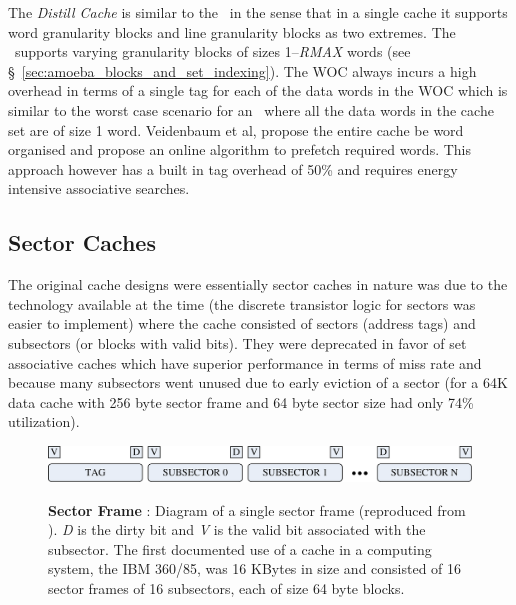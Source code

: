 The \textit{Distill Cache} is similar to the \AC\ in the sense that in a single cache it supports word granularity blocks and line granularity blocks as two extremes. The \AC\ supports varying granularity blocks of sizes 1--\textit{RMAX} words (see \S~\ref{sec:amoeba_blocks_and_set_indexing}). The WOC always incurs a high overhead in terms of a single tag for each of the data words in the WOC which is similar to the worst case scenario for an \AC\ where all the data words in the cache set are of size 1 word. Veidenbaum et al\cite{Veidenbaum:1999:ACL:305138.305188}, propose the entire cache be word organised and propose an online algorithm to prefetch required words. This approach however has a built in tag overhead of 50\% and requires energy intensive associative searches.

\subsection{Sector Caches}

The original cache designs\cite{liptay68} were essentially sector caches in nature was due to the technology available at the time (the discrete transistor logic for sectors was easier to implement) where the cache consisted of sectors (address tags) and subsectors (or blocks with valid bits). They were deprecated in favor of set associative caches which have superior performance in terms of miss rate and because many subsectors went unused due to early eviction of a sector (for a 64K data cache with 256 byte sector frame and 64 byte sector size had only 74\% utilization\cite{Rothman_Smith_2000}).
\\
\begin{figure}[h]
  \centering
  \includegraphics[width=\textwidth]{files/Figures/06-Sector.pdf}
  \\
  \caption[Sector Frame]{\textbf{Sector Frame} : Diagram of a single sector frame (reproduced from \cite{Rothman_Smith_2000}). \textit{D} is the dirty bit  and \textit{V} is the valid bit associated with the subsector. The first documented use of a cache in a computing system, the IBM 360/85, was 16 KBytes in size and consisted of 16 sector frames of 16 subsectors, each of size 64 byte blocks.}
  \label{fig:sector_frame}
\end{figure}

